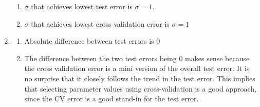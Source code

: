\documentclass[english]{article}
\begin{document}
\begin{enumerate}
\begin{enumerate}
\item $\sigma$ that achieves lowest test error is $\sigma = 1$.
\item $\sigma$ that achieves lowest cross-validation error is $\sigma = 1$
\end{enumerate}
\item 
\begin{enumerate}
\item Absolute difference between test errors is $0$
\item The difference between the two test errors being $0$ makes sense because the cross validation error is a mini version of the overall test error. It is no surprise that it closely follows the trend in the test error. This implies that selecting parameter values using cross-validation is a good approach, since the CV error is a good stand-in for the test error.
\end{enumerate}
\end{enumerate}
\end{document}
